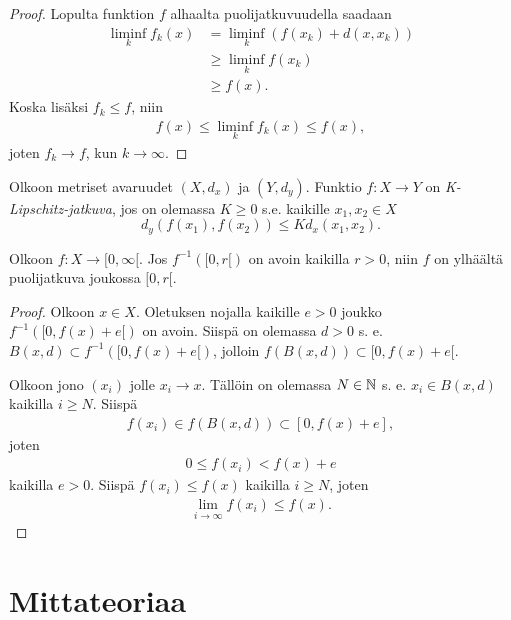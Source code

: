 \documentclass[12pt,oneside,a4paper]{amsbook} %
\begin{document}
\begin{proof}
    Lopulta funktion $f$ alhaalta puolijatkuvuudella saadaan
    \begin{align*}
        \liminf_k f_k(x) &= \liminf_k (f(x_k) + d(x,x_k)) \\
        &\ge \liminf_k f(x_k) \\
        & \ge f(x).
    \end{align*}
    Koska lisäksi $f_k \le f$, niin
    \begin{align*}
        f(x) \le \liminf_k f_k(x) \le f(x),
    \end{align*}
    joten $f_k \to f$, kun $k \to \infty$.
\end{proof}

\begin{definition}
    Olkoon metriset avaruudet $(X, d_x)$ ja $(Y, d_y)$. Funktio $f:X\to Y$ on \textit{K-Lipschitz-jatkuva}, jos on olemassa $K\ge 0$ s.e. kaikille $x_1,x_2 \in X$
    $$d_y(f(x_1),f(x_2)) \le Kd_x(x_1,x_2).$$
\end{definition}

\begin{lemma}\label{le:openPreimageImpliesUSC}
    Olkoon $f:X \to [0, \infty[$. Jos $f^{-1}([0, r[)$ on avoin kaikilla $r > 0$, niin $f$ on ylhäältä puolijatkuva joukossa $[0, r[$.
\end{lemma}
\begin{proof}
    Olkoon $x \in X$. Oletuksen nojalla kaikille $e > 0$ joukko $f^{-1}([0, f(x) + e[)$ on avoin. Siispä on olemassa $d > 0$ s. e. $B(x, d) \subset f^{-1}([0, f(x) + e[)$, jolloin $f(B(x,d)) \subset [0, f(x) + e[$.
    
    Olkoon jono $(x_i)$ jolle $x_i \to x$. Tällöin on olemassa $N \in \mathbb{N}$ s. e. $x_i \in B(x, d)$ kaikilla $i \ge N$. Siispä
    \begin{align*}
        f(x_i) \in f(B(x, d)) \subset [0, f(x) + e],
    \end{align*}
    joten
    \begin{align*}
        0 \le f(x_i) < f(x) + e
    \end{align*}
    kaikilla $e > 0$. Siispä $f(x_i) \le f(x)$ kaikilla $i \ge N$, joten
    \begin{align*}
        \lim_{i\to \infty}f(x_i) \le f(x).
    \end{align*}
\end{proof}


\section{Mittateoriaa}
\end{document}
